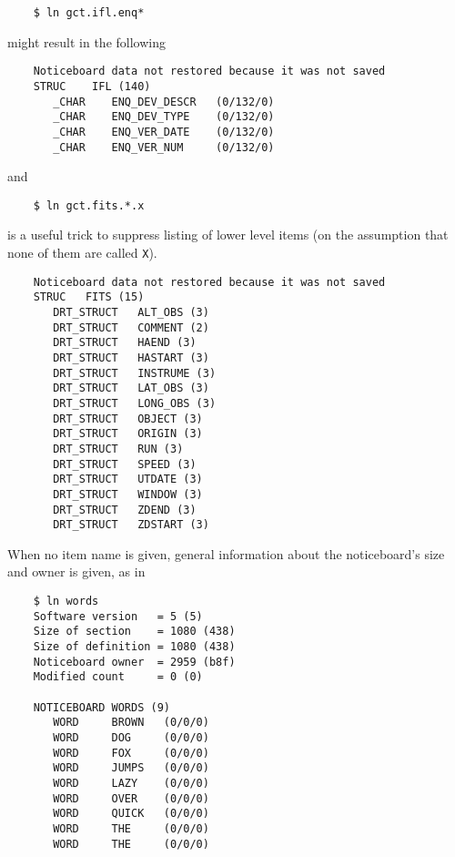 \begin{verbatim}
    $ ln gct.ifl.enq*
\end{verbatim}

might result in the following

\begin{verbatim}
    Noticeboard data not restored because it was not saved
    STRUC    IFL (140)  
       _CHAR    ENQ_DEV_DESCR   (0/132/0) 
       _CHAR    ENQ_DEV_TYPE    (0/132/0) 
       _CHAR    ENQ_VER_DATE    (0/132/0) 
       _CHAR    ENQ_VER_NUM     (0/132/0) 
\end{verbatim}

and

\begin{verbatim}
    $ ln gct.fits.*.x
\end{verbatim}

is a useful trick to suppress listing of lower level items (on the assumption
that none of them are called {\tt X}).

\begin{verbatim}
    Noticeboard data not restored because it was not saved
    STRUC   FITS (15)       
       DRT_STRUCT   ALT_OBS (3)     
       DRT_STRUCT   COMMENT (2)     
       DRT_STRUCT   HAEND (3)       
       DRT_STRUCT   HASTART (3)     
       DRT_STRUCT   INSTRUME (3)    
       DRT_STRUCT   LAT_OBS (3)     
       DRT_STRUCT   LONG_OBS (3)    
       DRT_STRUCT   OBJECT (3)      
       DRT_STRUCT   ORIGIN (3)      
       DRT_STRUCT   RUN (3) 
       DRT_STRUCT   SPEED (3)       
       DRT_STRUCT   UTDATE (3)      
       DRT_STRUCT   WINDOW (3)      
       DRT_STRUCT   ZDEND (3)       
       DRT_STRUCT   ZDSTART (3)	
\end{verbatim}

When no item name is given, general information about the noticeboard's size
and owner is given, as in

\begin {verbatim}
    $ ln words
    Software version   = 5 (5)
    Size of section    = 1080 (438)
    Size of definition = 1080 (438)
    Noticeboard owner  = 2959 (b8f)
    Modified count     = 0 (0)

    NOTICEBOARD WORDS (9)
       WORD     BROWN   (0/0/0)
       WORD     DOG     (0/0/0)
       WORD     FOX     (0/0/0)
       WORD     JUMPS   (0/0/0)
       WORD     LAZY    (0/0/0)
       WORD     OVER    (0/0/0)
       WORD     QUICK   (0/0/0)
       WORD     THE     (0/0/0)
       WORD     THE     (0/0/0)
\end{verbatim}

